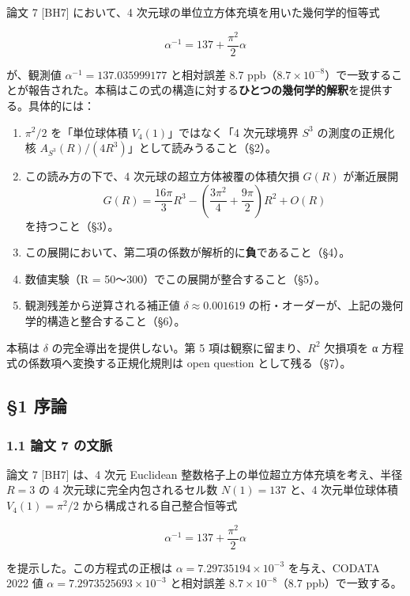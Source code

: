 \documentclass[
]{article}
\providecommand{\tightlist}{%
  \setlength{\itemsep}{0pt}\setlength{\parskip}{0pt}}
\begin{document}
論文 7 {[}BH7{]} において、4
次元球の単位立方体充填を用いた幾何学的恒等式

\[\alpha^{-1} = 137 + \frac{\pi^2}{2}\alpha\]

が、観測値 \(\alpha^{-1} = 137.035999177\) と相対誤差 8.7
ppb（\(8.7 \times 10^{-8}\)）で一致することが報告された。本稿はこの式の構造に対する\textbf{ひとつの幾何学的解釈}を提供する。具体的には：

\begin{enumerate}
\def\labelenumi{\arabic{enumi}.}
\tightlist
\item
  \(\pi^2/2\) を「単位球体積 \(V_4(1)\)」ではなく「4 次元球境界 \(S^3\)
  の測度の正規化核 \(A_{S^3}(R)/(4R^3)\)」として読みうること（§2）。
\item
  この読み方の下で、4 次元球の超立方体被覆の体積欠損 \(G(R)\) が漸近展開
  \[G(R) = \frac{16\pi}{3}R^3 - \left(\frac{3\pi^2}{4} + \frac{9\pi}{2}\right)R^2 + O(R)\]
  を持つこと（§3）。
\item
  この展開において、第二項の係数が解析的に\textbf{負}であること（§4）。
\item
  数値実験（R = 50〜300）でこの展開が整合すること（§5）。
\item
  観測残差から逆算される補正値 \(\delta \approx 0.001619\)
  の桁・オーダーが、上記の幾何学的構造と整合すること（§6）。
\end{enumerate}

本稿は \(\delta\) の完全導出を提供しない。第 5 項は観察に留まり、\(R^2\)
欠損項を α 方程式の係数項へ変換する正規化規則は open question
として残る（§7）。

\subsection{§1 序論}\label{ux5e8fux8ad6}

\subsubsection{1.1 論文 7
の文脈}\label{ux8ad6ux6587-7-ux306eux6587ux8108}

論文 7 {[}BH7{]} は、4 次元 Euclidean
整数格子上の単位超立方体充填を考え、半径 \(R = 3\) の 4
次元球に完全内包されるセル数 \(N(1) = 137\) と、4 次元単位球体積
\(V_4(1) = \pi^2/2\) から構成される自己整合恒等式

\[\alpha^{-1} = 137 + \frac{\pi^2}{2}\alpha \tag{1.1}\]

を提示した。この方程式の正根は \(\alpha = 7.29735194 \times 10^{-3}\)
を与え、CODATA 2022 値 \(\alpha = 7.2973525693 \times 10^{-3}\)
と相対誤差 \(8.7 \times 10^{-8}\)（8.7 ppb）で一致する。
\end{document}
